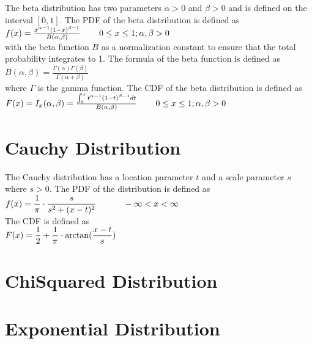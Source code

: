 		The beta distribution has two parameters $\alpha > 0$ and $\beta > 0$ and is defined on the interval $[0,1]$. The \ac{PDF} of the beta distribution is defined as
		\\[0.3cm]
		\hspace*{1.3cm}
		$f(x) = \frac{x^{\alpha-1}(1-x)^{\beta-1}}{B(\alpha,\beta)}  \hspace{.3in} 0 \le x \le 1; \alpha, \beta > 0$
		\\[0.3cm]		
		with the beta function $B$ as a normalization constant to ensure that the total probability integrates to 1. The formula of the beta function is defined as
		\\[0.3cm]
		\hspace*{1.3cm}
		$B(\alpha,\beta) = \frac{\Gamma(\alpha)\Gamma(\beta)}{\Gamma(\alpha + \beta)}$
		\\[0.3cm]
		where $\Gamma$ is the gamma function. The \ac{CDF} of the beta distribution is defined as
		\\[0.3cm]
		\hspace*{1.3cm}
		$F(x) = I_{x}(\alpha,\beta) = \frac{\int_{0}^{x}{t^{\alpha-1}(1-t)^{\beta-1}dt}}{B(\alpha,\beta)} \hspace{.3in} 0 \le x \le 1; \alpha, \beta > 0$


	\section{Cauchy Distribution}

		The Cauchy distribution has a location parameter $t$ and a scale parameter $s$ where $s > 0$. The \ac{PDF} of the distribution is defined as
		\\[0.3cm]
		\hspace*{1.3cm}
		$\displaystyle f(x) = \frac{1}{\pi} \cdot \frac{s}{s^2 + (x-t)^2} \quad \hspace{.3in} -\infty<x<\infty$
		\\[0.3cm]
		The \ac{CDF} is defined as 
		\\[0.3cm]
		\hspace*{1.3cm}
		$\displaystyle F(x) = \frac{1}{2} + \frac{1}{\pi} \cdot \arctan(\frac{x-t}{s})$		

	\section{ChiSquared Distribution}

	\section{Exponential Distribution}

